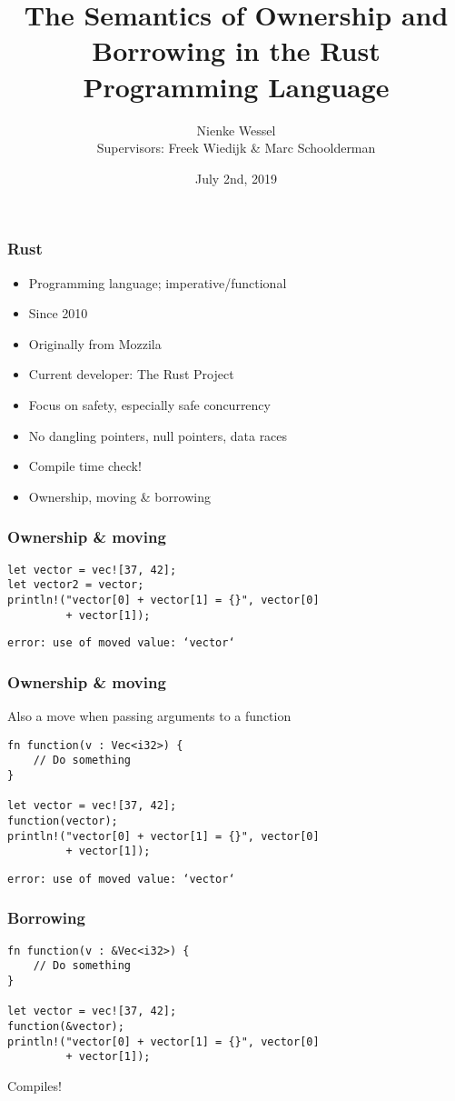 \documentclass{beamer}
\title[Rust Semantics]{The Semantics of Ownership and Borrowing in the Rust Programming Language}
\author[Nienke Wessel]{Nienke Wessel\\
\small Supervisors: Freek Wiedijk \& Marc Schoolderman}
\institute{Radboud University}
\date{July 2nd, 2019}
\begin{document}
 
\frame{\titlepage}




\begin{frame}
\frametitle{Rust}
\begin{itemize}
	\item Programming language; imperative/functional
	\item Since 2010
	\item Originally from Mozzila
	\item Current developer: The Rust Project
\end{itemize}
\pause

\begin{itemize}
	\item Focus on safety, especially safe concurrency
	\item No dangling pointers, null pointers, data races
	\item Compile time check!
	\item Ownership, moving \& borrowing
\end{itemize}
\end{frame}


\begin{frame}[fragile]
\frametitle{Ownership \& moving}

\begin{lstlisting}
let vector = vec![37, 42];
let vector2 = vector;
println!("vector[0] + vector[1] = {}", vector[0] 
         + vector[1]);
\end{lstlisting}

\texttt{error: use of moved value: `vector`}
\end{frame}


\begin{frame}[fragile]
\frametitle{Ownership \& moving}
Also a move when passing arguments to a function

\begin{lstlisting}
fn function(v : Vec<i32>) {
    // Do something
}

let vector = vec![37, 42];
function(vector);
println!("vector[0] + vector[1] = {}", vector[0] 
         + vector[1]);
\end{lstlisting}

\texttt{error: use of moved value: `vector`}
\end{frame}


\begin{frame}[fragile]
\frametitle{Borrowing}
\begin{lstlisting}
fn function(v : &Vec<i32>) {
    // Do something
}

let vector = vec![37, 42];
function(&vector);
println!("vector[0] + vector[1] = {}", vector[0]
         + vector[1]);
\end{lstlisting}

Compiles! \Checkmark
\end{frame}
\end{document}
